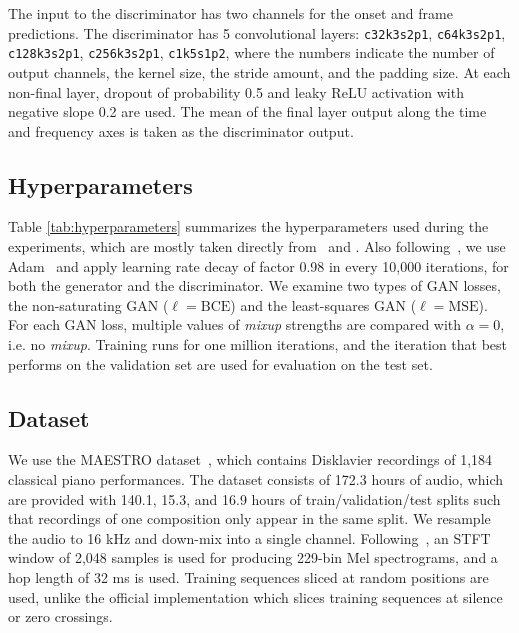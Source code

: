 The input to the discriminator has two channels for the onset and frame predictions.
The discriminator has 5 convolutional layers: \texttt{c32k3s2p1}, \texttt{c64k3s2p1}, \texttt{c128k3s2p1}, \texttt{c256k3s2p1}, \texttt{c1k5s1p2}, where the numbers indicate the number of output channels, the kernel size, the stride amount, and the padding size.
At each non-final layer, dropout of probability 0.5 and leaky ReLU activation with negative slope 0.2 are used.
The mean of the final layer output along the time and frequency axes is taken as the discriminator output.



\subsection{Hyperparameters}

Table \ref{tab:hyperparameters} summarizes the hyperparameters used during the experiments, which are mostly taken directly from~ and .
Also following~, we use Adam~\cite{kingma2015adam} and apply learning rate decay of factor 0.98 in every 10,000 iterations, for both the generator and the discriminator.
We examine two types of GAN losses, the non-saturating GAN ($\ell = \text{BCE}$) and the least-squares GAN ($\ell = \text{MSE}$).
For each GAN loss, multiple values of \textit{mixup} strengths are compared with $\alpha = 0$, i.e. no \textit{mixup}.
Training runs for one million iterations, and the iteration that best performs on the validation set are used for evaluation on the test set.

\subsection{Dataset}

We use the MAESTRO dataset~\cite{hawthorne2019maestro}, which contains Disklavier recordings of 1,184 classical piano performances.
The dataset consists of 172.3 hours of audio, which are provided with 140.1, 15.3, and 16.9 hours of train/validation/test splits such that recordings of one composition only appear in the same split.
We resample the audio to 16 kHz and down-mix into a single channel.
Following~, an STFT window of 2,048 samples is used for producing 229-bin Mel spectrograms, and a hop length of 32 ms is used.
Training sequences sliced at random positions are used, unlike the official implementation which slices training sequences at silence or zero crossings.


